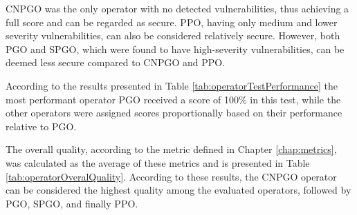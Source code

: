 CNPGO was the only operator with no detected vulnerabilities, thus achieving a full score and can be regarded as secure. PPO, having only medium and lower severity vulnerabilities, can also be considered relatively secure. However, both PGO and SPGO, which were found to have high-severity vulnerabilities, can be deemed less secure compared to CNPGO and PPO.

According to the results presented in Table \ref{tab:operatorTestPerformance} the most performant operator PGO received a score of 100\% in this test, while the other operators were assigned scores proportionally based on their performance relative to PGO.



The overall quality, according to the metric defined in Chapter \ref{chap:metrics}, was calculated as the average of these metrics and is presented in Table \ref{tab:operatorOveralQuality}.
According to these results, the CNPGO operator can be considered the highest quality among the evaluated operators, followed by PGO, SPGO, and finally PPO.





